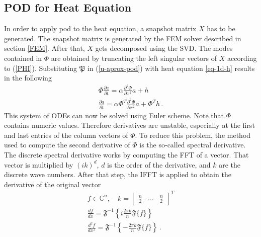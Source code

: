 \subsection{POD for Heat Equation}
In order to apply pod to the heat equation, a snapshot matrix \(X\) has to be generated.
The snapshot matrix is generated by the FEM solver described in section \ref{FEM}.
After that, \(X\) gets decomposed using the SVD.
The modes contained in \(\Phi\) are obtained by truncating the left singular vectors of \(X\) according to (\ref{PHI}).
Substituting \(\mathfrak{P}\) in (\ref{u-aprox-pod}) with heat equation \ref{eq-1d-h} results in the following
\begin{gather}
\Phi \frac{\partial a}{\partial t}  = \alpha \frac{\partial^{2} \Phi}{\partial x^{2}} a + h\\
\frac{\partial a}{\partial t} = \alpha \Phi^{T}  \frac{\partial^{2} \Phi}{\partial x^{2}} a + \Phi^{T}h \,.
\end{gather}
This system of ODEs can now be solved using Euler scheme.
Note that \(\Phi\) contains numeric values.
Therefore derivatives are unstable, especially at the first and last entries of the column vectors of \(\Phi\).
To reduce this problem, the method used to compute the second derivative of \(\Phi\) is the so-called spectral derivative.
The discrete spectral derivative works by computing the FFT of a vector.
That vector is multiplied by \((ik)^{d}\), \(d\) is the order of the derivative, and \(k\) are the discrete wave numbers.
After that step, the IFFT is applied to obtain the derivative of the original vector \cite{brunton_kutz_2019f}
\begin{gather}
f \in \mathbb{C}^{n}, \quad k = \begin{bmatrix}
\frac{n}{2} & \hdots & \frac{n}{2}
\end{bmatrix}^{T} \\
\frac{df}{dx} = \mathfrak{F}^{-1}\left\{i \frac{2 \pi k}{n} \mathfrak{F}\{f\}\right\} \\
\frac{d^{2}f}{dx^{2}} = \mathfrak{F}^{-1}\left\{-\frac{2 \pi k}{n} \mathfrak{F}\{f\}\right\} \,.
\end{gather}

